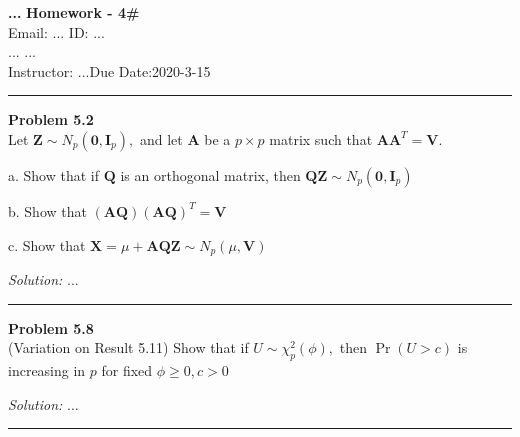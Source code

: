 \documentclass[a4paper, 11pt]{article}
\newenvironment{problem}[2][Problem]
    { \begin{mdframed}[backgroundcolor=gray!20] \textbf{#1 #2} \\}
    {  \end{mdframed}}
\newenvironment{solution}
    {\textit{Solution:}}
    {}
\begin{document}
\noindent
\large\textbf{...} \hfill \textbf{Homework - 4\#}   \\
Email: ... \hfill ID: ... \\
\normalsize ... \hfill ...\\
Instructor: ...\hfill Due Date:2020-3-15 \\
\noindent\rule{7in}{2.8pt}

\begin{problem}{5.2}
Let $\mathbf{Z} \sim N_{p}\left(\mathbf{0}, \mathbf{I}_{p}\right),$ and let $\mathbf{A}$ be a $p \times p$ matrix such that $\mathbf{A A}^{T}=\mathbf{V}$.

a. Show that if $\mathbf{Q}$ is an orthogonal matrix, then $\mathbf{Q Z} \sim N_{p}\left(\mathbf{0}, \mathbf{I}_{p}\right)$

b. Show that $(\mathbf{A Q})(\mathbf{A Q})^{T}=\mathbf{V}$

c. Show that $\mathbf{X}=\mu+\mathbf{A Q Z} \sim N_{p}(\mu, \mathbf{V})$
\end{problem}
\begin{solution}
...
\end{solution} 

\noindent\rule{7in}{2.8pt}


\begin{problem}{5.8}
(Variation on Result 5.11) Show that if $U \sim \chi_{p}^{2}(\phi),$ then $\operatorname{Pr}(U>c)$ is increasing in $p$ for fixed $\phi \geq 0, c>0$
\end{problem}
\begin{solution}
...
\end{solution} 

\noindent\rule{7in}{2.8pt}
\end{document}
